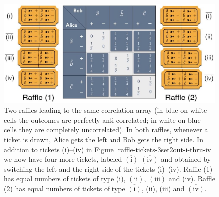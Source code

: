 \begin{figure}[ht]   
 \centering
   \includegraphics[width=4.5in]{CA-3set2out-raffle-25i25ii25iii25iv.jpeg} 
   \caption{Two raffles leading to the same correlation array (in blue-on-white cells the outcomes are perfectly anti-correlated; in white-on-blue cells they are completely uncorrelated). In both raffles, whenever a ticket is drawn, Alice gets the left and Bob gets the right side. In addition to tickets (i)--(iv) in Figure \ref{raffle-tickets-3set2out-i-thru-iv} we now have four more tickets, labeled $\overline{(\mathrm{i})}$-$\overline{(\mathrm{iv})}$ and obtained by switching the left and the right side of the tickets (i)--(iv).  Raffle (1) has equal numbers of tickets of type (i), $\overline{(\mathrm{ii})}$, $\overline{(\mathrm{iii})}$ and (iv). Raffle (2) has equal numbers of tickets of type $\overline{(\mathrm{i})}$, (ii), (iii) and $\overline{(\mathrm{iv})}$.}
   \label{CA-3set2out-raffle-25i25ii25iii25iv}
\end{figure}

